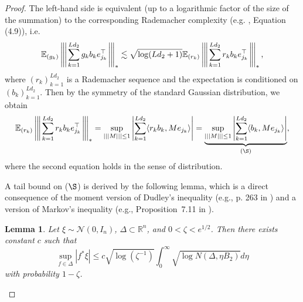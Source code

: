 \documentclass[11pt]{article}
\newtheorem{lemma}{Lemma}[section]
\newcommand{\xspace}{\hbox{\kern-2.5pt}}
\newcommand\tnorm[1]{\left\vert\xspace\left\vert\xspace\left\vert\mskip2mu
#1\mskip2mu \right\vert\xspace\right\vert\xspace\right\vert}
\newcommand{\E}{\mathbb{E}}
\begin{document}
\begin{proof}
The left-hand side is equivalent (up to a logarithmic factor of the size of the summation) to the corresponding Rademacher complexity (e.g. \citep{ledoux2013probability}, Equation (4.9)), i.e.
\begin{equation*}
\mathbb{E}_{(g_k)} \tnorm{ \sum_{k=1}^{Ld_2} g_k b_k e_{j_k}^\top}_*
\lesssim \sqrt{\log (Ld_2 + 1)}
\mathbb{E}_{(r_k)} \tnorm{ \sum_{k=1}^{Ld_2} r_k b_k e_{j_k}^\top}_*,
\end{equation*}
where $(r_k)_{k=1}^{Ld_2}$ is a Rademacher sequence and the expectation is conditioned on $(b_k)_{k=1}^{Ld_2}$. Then by the symmetry of the standard Gaussian distribution, we obtain
\begin{equation*}
\begin{aligned}
\E_{(r_k)} \tnorm{\sum_{k=1}^{Ld_2} r_k b_k e_{j_k}^\top}_{*} 
= \sup_{\vert\vert\vert M \vert\vert\vert \leq 1} \left| \sum_{k=1}^{Ld_2} \langle r_k b_k, M e_{j_k} \rangle \right| 
= \underbrace{ \sup_{\vert\vert\vert M \vert\vert\vert \leq 1} \left | \sum_{k=1}^{Ld_2} \langle b_k, M e_{j_k} \rangle  \right |}_{\text{($\S$)}},
\end{aligned}
\end{equation*}
where the second equation holds in the sense of distribution.

A tail bound on ($\S$) is derived by the following lemma, which is a direct consequence of the moment version of Dudley's inequality (e.g., p. 263 in \citep{foucart2013mathematical}) and a version of Markov's inequality (e.g., Proposition~7.11 in \citep{foucart2013mathematical}).

\begin{lemma}
\label{lemma:gaussianmax}
Let $\xi \sim \mathcal{N}(0,I_n)$, $\Delta \subset \mathbb{R}^n$, and $0 < \zeta < e^{1/2}$. 
Then there exists constant $c$ such that
\[ \sup_{f \in \Delta}  \left | f^* \xi \right | \leq c \sqrt{\log (\zeta^{-1}) } \int_{0}^{\infty} \sqrt{\log N(\Delta, \eta B_2)} d\eta \] with probability $1 - \zeta$.
\end{lemma}


\end{proof}
\end{document}
